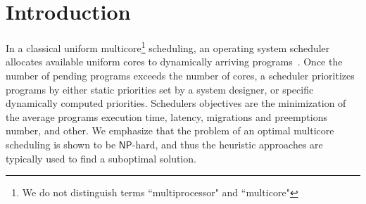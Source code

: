 \chapter{Introduction}
\label{chap:intro}

In a classical uniform multicore\footnote{We do not distinguish terms ``multiprocessor" and ``multicore"} scheduling, an operating system scheduler allocates available uniform cores to dynamically arriving programs~\cite{Anderson2006}. Once the number of pending programs exceeds the number of cores, a scheduler prioritizes programs by either static priorities set by a system designer, or specific dynamically computed priorities. Schedulers objectives are the minimization of the average programs execution time, latency, migrations and preemptions number, and other. We emphasize that the problem of an optimal multicore scheduling is shown to be $\mathsf{NP}$-hard, and thus the heuristic approaches are typically used to find a suboptimal solution.

